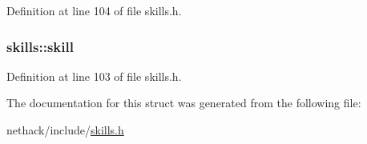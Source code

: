 Definition at line 104 of file skills.\+h.

\hypertarget{structskills_aada4693a6fea3ed45385506066006c67}{
\subsubsection[{skill}]{ skills\+::skill}}\label{structskills_aada4693a6fea3ed45385506066006c67}


Definition at line 103 of file skills.\+h.



The documentation for this struct was generated from the following file\+:\begin{DoxyCompactItemize}
\item 
nethack/include/\hyperlink{skills_8h}{skills.\+h}\end{DoxyCompactItemize}
